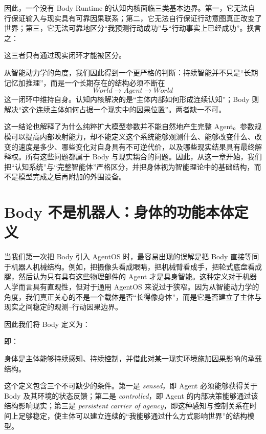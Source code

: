 因此，一个没有 Body Runtime 的认知内核面临三类基本边界。第一，它无法自行保证输入与现实具有可靠因果联系；第二，它无法自行保证行动意图真正改变了世界；第三，它无法可靠地区分“我预测行动成功”与“行动事实上已经成功”。换言之：
\begin{statementbox}
\centering
{}
\end{statementbox}
这三者只有通过现实闭环才能被区分。

从智能动力学的角度，我们因此得到一个更严格的判断：持续智能并不只是“长期记忆加推理”，而是一个长期存在的结构必须不断在
\[
World
\rightarrow
Agent
\rightarrow
World
\]
这一闭环中维持自身。认知内核解决的是“主体内部如何形成连续认知”；Body 则解决“这个连续主体如何占据一个现实中的因果位置”。两者缺一不可。

这一结论也解释了为什么纯粹扩大模型参数并不能自然地产生完整 Agent。参数规模可以提高内部映射能力，却不能定义这个系统能够观测什么、能够改变什么、改变的速度是多少、哪些变化对自身具有不可逆代价，以及哪些现实结果具有最终解释权。所有这些问题都属于 Body 与现实耦合的问题。因此，从这一章开始，我们把“认知系统”与“完整智能体”严格区分，并把身体视为智能理论中的基础结构，而不是模型完成之后再附加的外围设备。

\section{Body 不是机器人：身体的功能本体定义}

当我们第一次把 Body 引入 AgentOS 时，最容易出现的误解是把 Body 直接等同于机器人机械结构。例如，把摄像头看成眼睛，把机械臂看成手，把轮式底盘看成腿，然后认为只有具有这些物理部件的 Agent 才是具身智能。这种定义对于机器人学而言具有直观性，但对于通用 AgentOS 来说过于狭窄。因为从智能动力学的角度，我们真正关心的不是一个载体是否“长得像身体”，而是它是否建立了主体与现实之间稳定的观测--行动因果边界。

因此我们将 Body 定义为：
\begin{statementbox}
\centering
{}
\end{statementbox}
即：
\begin{statementbox}
身体是主体能够持续感知、持续控制，并借此对某一现实环境施加因果影响的承载结构。
\end{statementbox}

这个定义包含三个不可缺少的条件。第一是 \emph{sensed}，即 Agent 必须能够获得关于 Body 及其环境的状态反馈；第二是 \emph{controlled}，即 Agent 的内部决策能够通过该结构影响现实；第三是 \emph{persistent carrier of agency}，即这种感知与控制关系在时间上足够稳定，使主体可以建立连续的“我能够通过什么方式影响世界”的结构模型。

